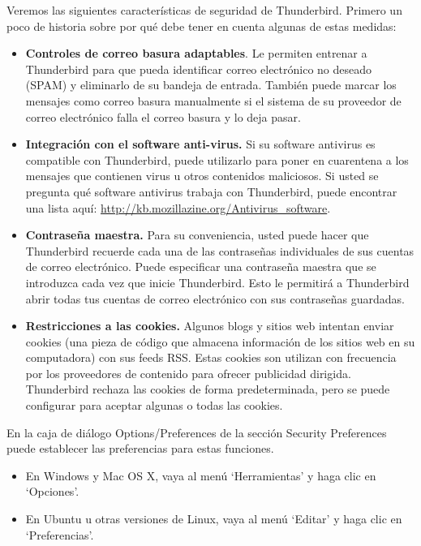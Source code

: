 \documentclass[10pt,a5paper,twoside,,]{book}
\providecommand{\tightlist}{%
  \setlength{\itemsep}{0pt}\setlength{\parskip}{0pt}}
\begin{document}
Veremos las siguientes características de seguridad de Thunderbird.
Primero un poco de historia sobre por qué debe tener en cuenta algunas
de estas medidas:

\begin{itemize}
\tightlist
\item
  \textbf{Controles de correo basura adaptables}. Le permiten entrenar a
  Thunderbird para que pueda identificar correo electrónico no deseado
  (SPAM) y eliminarlo de su bandeja de entrada. También puede marcar los
  mensajes como correo basura manualmente si el sistema de su proveedor
  de correo electrónico falla el correo basura y lo deja pasar.
\item
  \textbf{Integración con el software anti-virus.} Si su software
  antivirus es compatible con Thunderbird, puede utilizarlo para poner
  en cuarentena a los mensajes que contienen virus u otros contenidos
  maliciosos. Si usted se pregunta qué software antivirus trabaja con
  Thunderbird, puede encontrar una lista aquí:
  \url{http://kb.mozillazine.org/Antivirus_software}.
\item
  \textbf{Contraseña maestra.} Para su conveniencia, usted puede hacer
  que Thunderbird recuerde cada una de las contraseñas individuales de
  sus cuentas de correo electrónico. Puede especificar una contraseña
  maestra que se introduzca cada vez que inicie Thunderbird. Esto le
  permitirá a Thunderbird abrir todas tus cuentas de correo electrónico
  con sus contraseñas guardadas.
\item
  \textbf{Restricciones a las cookies.} Algunos blogs y sitios web
  intentan enviar cookies (una pieza de código que almacena información
  de los sitios web en su computadora) con sus feeds RSS. Estas cookies
  son utilizan con frecuencia por los proveedores de contenido para
  ofrecer publicidad dirigida. Thunderbird rechaza las cookies de forma
  predeterminada, pero se puede configurar para aceptar algunas o todas
  las cookies.
\end{itemize}

En la caja de diálogo Options/Preferences de la sección Security
Preferences puede establecer las preferencias para estas funciones.

\begin{itemize}
\tightlist
\item
  En Windows y Mac OS X, vaya al menú `Herramientas' y haga clic en
  `Opciones'.
\item
  En Ubuntu u otras versiones de Linux, vaya al menú `Editar' y haga
  clic en `Preferencias'.
\end{itemize}
\end{document}
